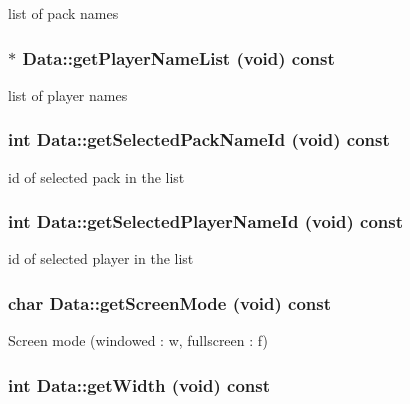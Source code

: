 list of pack names 
\subsubsection{$\ast$ Data::getPlayerNameList (void) const\hspace{0.3cm}{\tt  [inline]}}\label{classData_376cf46edec1f0e63f8a054497147e25}


list of player names 
\subsubsection{\setlength{\rightskip}{0pt plus 5cm}int Data::getSelectedPackNameId (void) const\hspace{0.3cm}{\tt  [inline]}}\label{classData_e86dd62d9fff6483bc5898f1f9f5030a}


id of selected pack in the list 
\subsubsection{\setlength{\rightskip}{0pt plus 5cm}int Data::getSelectedPlayerNameId (void) const\hspace{0.3cm}{\tt  [inline]}}\label{classData_e6655adbecaddaf9efc0e62bf3bcd69f}


id of selected player in the list 
\subsubsection{\setlength{\rightskip}{0pt plus 5cm}char Data::getScreenMode (void) const\hspace{0.3cm}{\tt  [inline]}}\label{classData_ee69054ed9720f8950b9ab8357a4bc6a}


Screen mode (windowed : w, fullscreen : f) 
\subsubsection{\setlength{\rightskip}{0pt plus 5cm}int Data::getWidth (void) const\hspace{0.3cm}{\tt  [inline]}}\label{classData_438bd9ad59a687ffcadf55a749e79d3d}



